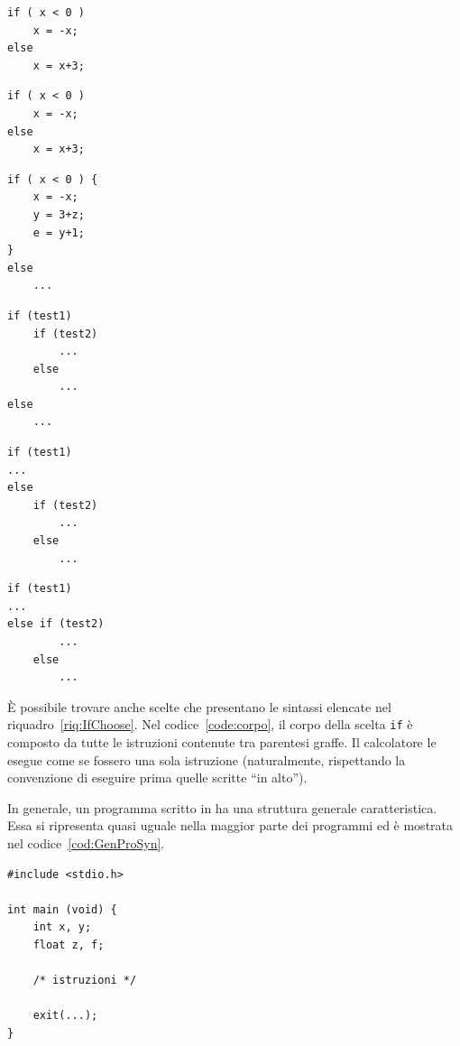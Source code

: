 \begin{code}
\begin{minipage}{0.45\columnwidth}
	\begin{lstlisting}[caption={\ },nolol]
if ( x < 0 )
	x = -x;
else
	x = x+3;
	\end{lstlisting}
\end{minipage}	\hfill
\begin{minipage}{0.45\columnwidth}
	\begin{lstlisting}[caption={\ },nolol]
if ( x < 0 )
	x = -x;
else
	x = x+3;
	\end{lstlisting}
\end{minipage}	\hfill
\begin{minipage}{0.45\columnwidth}
	\begin{lstlisting}[caption={\ },nolol,label={code:corpo}]
if ( x < 0 ) {
	x = -x;
	y = 3+z;
	e = y+1;
}
else
	...
	\end{lstlisting}
\end{minipage}	\hfill
\begin{minipage}{0.45\columnwidth}
\begin{lstlisting}[caption={\ },nolol]
if (test1)
	if (test2)
		...
	else
		...
else
	...
	\end{lstlisting}
\end{minipage}	\hfill
\begin{minipage}{0.45\columnwidth}
	\begin{lstlisting}[caption={\ },nolol]
if (test1) 
...
else
	if (test2)
		...
	else
		...
	\end{lstlisting}
\end{minipage}	\hfill
\begin{minipage}{0.45\columnwidth}
	\begin{lstlisting}[caption={\ },nolol]
if (test1) 
...
else if (test2)
		...
	else
		...
	\end{lstlisting}
\end{minipage}
\caption{Sintassi della scelta \lstinline!if (...)  else!}
\label{riq:IfChoose}
\end{code}
È possibile trovare anche scelte che presentano le sintassi elencate nel riquadro~\vref{riq:IfChoose}. Nel codice~\vref{code:corpo}, il corpo della scelta \lstinline!if! è composto da tutte le istruzioni contenute tra parentesi graffe. Il calcolatore le esegue come se fossero una sola istruzione (naturalmente, rispettando la convenzione di eseguire prima quelle scritte  ``in alto'').

In  generale, un programma scritto in  ha una struttura generale caratteristica. Essa si ripresenta quasi uguale nella maggior parte dei programmi ed è mostrata nel codice~\vref{cod:GenProSyn}.
\begin{lstlisting}[caption={[\em Struttura di un programma in linguaggio \lang{C}.] {Struttura generale di un programma in linguaggio \lang{C}.}},float,label={cod:GenProSyn}]
#include <stdio.h>

int main (void) {
	int x, y;
	float z, f;

	/* istruzioni */

	exit(...);
}
\end{lstlisting}